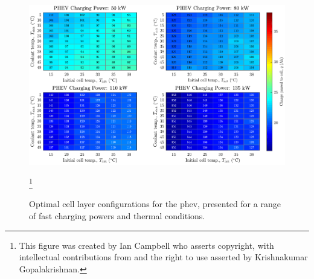 \begin{figure}[!bp]
    \begin{minipage}[t]{\textwidth}
        \centering
        \includegraphics[width=\textwidth]{fig_generate_heatmap_PHEV}
        \caption[Optimal cell  layer configurations for  the \gls{phev},  presented for a  range of
        fast charging powers and thermal conditions]{Optimal cell  layer configurations for  the \gls{phev},  presented for a  range of
        fast charging powers and thermal conditions\footnotemark.}
        \label{fig:fig_generate_heatmap_PHEV}
        \mpfootnotes[1]
        \footnote{This figure was created by Ian Campbell who asserts copyright,
            with  intellectual  contributions  from  and   the  right  to  use  asserted  by
        Krishnakumar Gopalakrishnan.}
    \end{minipage}
\end{figure}
